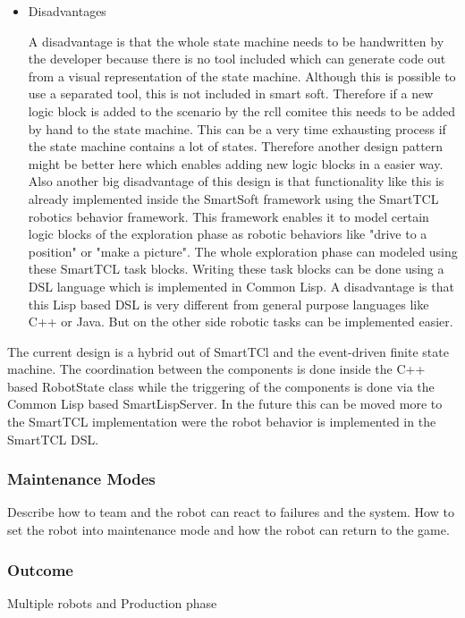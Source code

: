 \begin{itemize}
\item Disadvantages

A disadvantage is that the whole state machine needs to be handwritten by the developer because there is no tool included which can generate code out from a visual representation 
of the state machine. Although this is possible to use a separated tool, this is not included in smart soft. Therefore if a new logic block is added to the scenario by the rcll comitee this needs to be added by hand to the state machine. This can be a very time exhausting process if the state machine contains a lot of states. Therefore another design pattern might be better here which enables adding new logic blocks in a easier way. \\

Also another big disadvantage of this design is that functionality like this is already implemented inside the SmartSoft framework using the SmartTCL robotics behavior framework.
This framework enables it to model certain logic blocks of the exploration phase as robotic behaviors like "drive to a position" or "make a picture". The whole exploration phase can modeled using these SmartTCL task blocks. Writing these task blocks can be done using a DSL language which is implemented in Common Lisp. A disadvantage is that this Lisp based DSL is 
very different from general purpose languages like C++ or Java. But on the other side robotic tasks can be implemented easier. 


\end{itemize}


The current design is a hybrid out of SmartTCl and the event-driven finite state machine. The coordination between the components is done inside the C++ based RobotState class while the
triggering of the components is done via the Common Lisp based SmartLispServer. In the future this can be moved more to the SmartTCL implementation were the robot behavior is implemented in the SmartTCL DSL. 


\subsubsection{Maintenance Modes}

Describe how to team and the robot can react to failures and the system. How to set the robot into maintenance mode and how the robot can return to the game. 


\subsubsection{Outcome}

Multiple robots and Production phase







